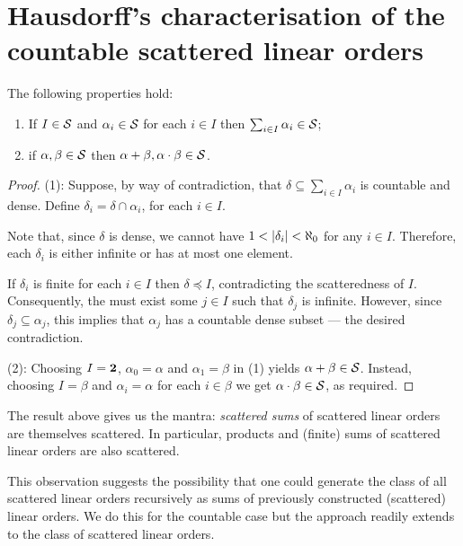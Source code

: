 \section{Hausdorff's characterisation of the countable scattered linear orders}

\begin{prp}
	\label{prp:OpScattered}
	The following properties hold:
	\begin{enumerate}
		\item   If $I\in\mathcal{S}$ and $\alpha_i\in\mathcal{S}$ for each
			$i\in I$ then $\sum_{i\in I}\alpha_i\in\mathcal{S}$;
		\item   if $\alpha,\beta\in\mathcal{S}$ then
			$\alpha+\beta,\alpha\cdot\beta\in\mathcal{S}$.
	\end{enumerate}
\end{prp}
\begin{proof}
		(1):  Suppose, by way of contradiction, that $\delta\subseteq\sum_{i\in
		I}\alpha_i$ is countable and dense.  Define
		$\delta_i=\delta\cap\alpha_i$, for each $i\in I$.

		Note that, since $\delta$ is dense, we cannot have
		$1<\left\lvert\delta_i\right\rvert<\aleph_0$ for any $i\in I$.  Therefore, each
		$\delta_i$ is either infinite or has at most one element.

		If $\delta_i$ is finite for each $i\in I$ then $\delta\preceq I$,
		contradicting the scatteredness of $I$.  Consequently, the must exist
		some $j\in I$ such that $\delta_j$ is infinite.  However, since
		$\delta_j\subseteq\alpha_j$, this implies that $\alpha_j$ has a
		countable dense subset --- the desired contradiction.

		(2):  Choosing $I=\mathbf{2}$, $\alpha_0=\alpha$ and $\alpha_1=\beta$ in (1)
		yields $\alpha+\beta\in\mathcal{S}$.  Instead, choosing $I=\beta$ and
		$\alpha_i=\alpha$ for each $i\in\beta$ we get
		$\alpha\cdot\beta\in\mathcal{S}$, as required.
\end{proof}

The result above gives us the mantra: \textit{scattered sums} of scattered
linear orders are themselves scattered.  In particular, products and (finite)
sums of scattered linear orders are also scattered.

This observation suggests the possibility that one could generate the class of
all scattered linear orders recursively as sums of previously constructed
(scattered) linear orders.  We do this for the countable case but the approach
readily extends to the class of  scattered linear orders.

